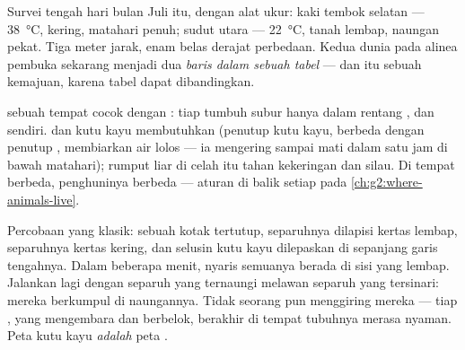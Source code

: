 \begin{example}\label{ex:g6:exploring-our-environment:measured}
Survei tengah hari bulan Juli itu, dengan alat ukur: kaki tembok
selatan --- \qty{38}{\degreeCelsius}, kering, matahari penuh; sudut
utara --- \qty{22}{\degreeCelsius}, tanah lembap, naungan pekat. Tiga
meter jarak, enam belas derajat perbedaan. Kedua dunia pada alinea
pembuka sekarang menjadi dua \emph{baris dalam sebuah tabel} --- dan
itu sebuah kemajuan, karena tabel dapat dibandingkan.
\end{example}

\begin{proposition}\label{prop:g6:exploring-our-environment:decide}
 sebuah tempat cocok dengan : tiap 
tumbuh subur hanya dalam rentang ,  dan 
sendiri.  dan kutu kayu membutuhkan  (penutup kutu
kayu, berbeda dengan penutup , membiarkan air lolos --- ia
mengering sampai mati dalam satu jam di bawah matahari); rumput liar
di celah itu tahan kekeringan dan silau. Di tempat  berbeda,
penghuninya berbeda --- aturan di balik setiap  pada
\cref{ch:g2:where-animals-live}.
\end{proposition}
\admitted

\begin{example}\label{ex:g6:exploring-our-environment:chooser}
Percobaan yang klasik: sebuah kotak tertutup, separuhnya dilapisi
kertas lembap, separuhnya kertas kering, dan selusin kutu kayu
dilepaskan di sepanjang garis tengahnya. Dalam beberapa menit, nyaris
semuanya berada di sisi yang lembap. Jalankan lagi dengan separuh yang
ternaungi melawan separuh yang tersinari: mereka berkumpul di
naungannya. Tidak seorang pun menggiring mereka --- tiap , yang
mengembara dan berbelok, berakhir di tempat tubuhnya merasa nyaman.
Peta kutu kayu \emph{adalah} peta .
\end{example}

